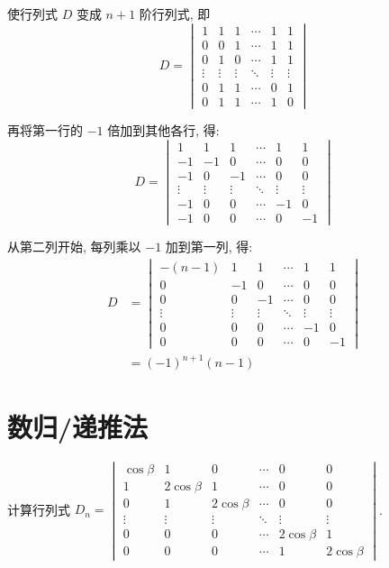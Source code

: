 \begin{solution}
    使行列式 $D$ 变成 $n+1$ 阶行列式, 即
    \[ D=\begin{vmatrix}
            1 & 1 & 1 & \cdots & 1 & 1 \\
            0 & 0 & 1 & \cdots & 1 & 1 \\
            0 & 1 & 0 & \cdots & 1 & 1 \\
            \vdots & \vdots & \vdots & \ddots & \vdots & \vdots \\
            0 & 1 & 1 & \cdots & 0 & 1 \\
            0 & 1 & 1 & \cdots & 1 & 0
    \end{vmatrix} \]

    再将第一行的 $-1$ 倍加到其他各行, 得:
    \[ D=\begin{vmatrix}
        1 & 1 & 1 & \cdots & 1 & 1 \\
        -1 & -1 & 0 & \cdots & 0 & 0 \\
        -1 & 0 & -1 & \cdots & 0 & 0 \\
        \vdots & \vdots & \vdots & \ddots & \vdots & \vdots \\
        -1 & 0 & 0 & \cdots & -1 & 0 \\
        -1 & 0 & 0 & \cdots & 0 & -1
    \end{vmatrix} \]

    从第二列开始, 每列乘以 $-1$ 加到第一列, 得:
    \begin{align*}
        D &=\begin{vmatrix}
            -(n-1) & 1 & 1 & \cdots & 1 & 1 \\
            0 & -1 & 0 & \cdots & 0 & 0 \\
            0 & 0 & -1 & \cdots & 0 & 0 \\
            \vdots & \vdots & \vdots & \ddots & \vdots & \vdots \\
            0 & 0 & 0 & \cdots & -1 & 0 \\
            0 & 0 & 0 & \cdots & 0 & -1
            \end{vmatrix} \\
        &=(-1)^{n+1}(n-1)
    \end{align*}
\end{solution}


\section{数归/递推法}

\begin{example} \label{ex:17:递推法}
    计算行列式
    $D_n=\begin{vmatrix}
        \cos \beta & 1 & 0 & \cdots & 0 & 0 \\
        1 & 2 \cos \beta & 1 & \cdots & 0 & 0 \\
        0 & 1 & 2 \cos \beta & \cdots & 0 & 0 \\
        \vdots & \vdots & \vdots & \ddots & \vdots & \vdots \\
        0 & 0 & 0 & \cdots & 2 \cos \beta & 1 \\
        0 & 0 & 0 & \cdots & 1 & 2 \cos \beta
    \end{vmatrix}$.
\end{example}

